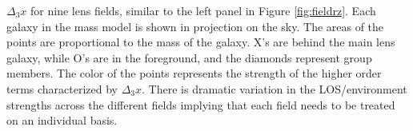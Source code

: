 \label{fig:allfields} $\Delta_3x$ for nine lens fields, similar to the left panel in Figure \ref{fig:fieldrz}. Each galaxy in the mass model is shown in projection on the sky. The areas of the points are proportional to the mass of the galaxy. X's are behind the main lens galaxy, while O's are in the foreground, and the diamonds represent group members. The color of the points represents the strength of the higher order terms characterized by $\Delta_3 x$. There is dramatic variation in the LOS/environment strengths across the different fields implying that each field needs to be treated on an individual basis.